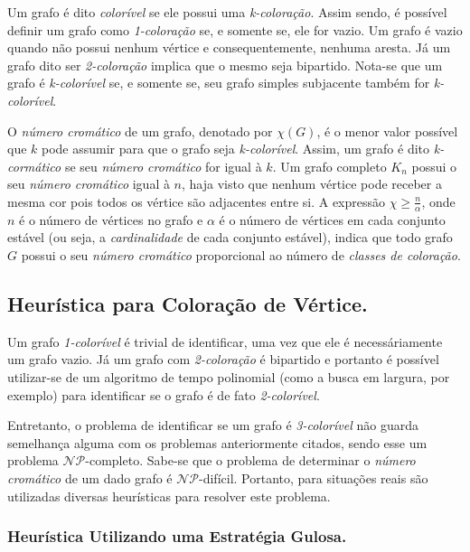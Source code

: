 \documentclass[12pt]{article}
\begin{document}
Um grafo é dito \emph{colorível} se ele possui uma \emph{k-coloração}. Assim sendo, é possível definir um grafo como \emph{1-coloração} se, e somente se, ele for vazio. Um grafo é vazio quando não possui nenhum vértice e consequentemente, nenhuma aresta. Já um grafo dito ser \emph{2-coloração} implica que o mesmo seja bipartido. Nota-se que um grafo é \emph{k-colorível} se, e somente se, seu grafo simples subjacente também for \emph{k-colorível}.

O \emph{número cromático} de um grafo, denotado por $\chi(G)$, é o menor valor possível que $k$ pode assumir para que o grafo seja \emph{k-colorível}. Assim, um grafo é dito \emph{k-cormático} se seu \emph{número cromático} for igual à $k$. Um grafo completo $K_n$ possui o seu \emph{número cromático} igual à $n$, haja visto que nenhum vértice pode receber a mesma cor pois todos os vértice são adjacentes entre si. A expressão
$\chi \geq \frac{n}{\alpha}$, onde $n$ é o número de vértices no grafo e $\alpha$ é o número de vértices em cada conjunto estável (ou seja, a \emph{cardinalidade} de cada conjunto estável), indica que todo grafo $G$ possui o seu \emph{número cromático} proporcional ao número de \emph{classes de coloração}.

\subsection{Heurística para Coloração de Vértice.}


Um grafo \emph{1-colorível} é trivial de identificar, uma vez que ele é necessáriamente um grafo vazio. Já um grafo com \emph{2-coloração} é bipartido e portanto é possível utilizar-se de um algoritmo de tempo polinomial (como a busca em largura, por exemplo) para identificar se o grafo é de fato \emph{2-colorível}.

Entretanto, o problema de identificar se um grafo é \emph{3-colorível} não guarda semelhança alguma com os problemas anteriormente citados, sendo esse um problema $\mathcal{NP}$-completo. Sabe-se que o problema de determinar o \emph{número cromático} de um dado grafo é $\mathcal{NP}$-difícil. Portanto, para situações reais são utilizadas diversas heurísticas para resolver este problema.

\subsubsection{Heurística Utilizando uma Estratégia Gulosa.}
\end{document}
